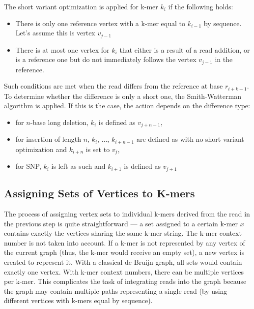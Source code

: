 The short variant optimization is applied for k-mer $k_i$ if the following holds:
\begin{itemize}
\item There is only one reference vertex with a k-mer equal to $k_{i-1}$ by sequence. Let's assume this is vertex $v_{j-1}$
\item There is at most one vertex for $k_i$ that either is a result of a read addition, or is a reference one but do not immediately follows  the vertex $v_{j-1}$ in the reference.
\end{itemize}
Such conditions are met when the read differs from the reference at base $r_{i+k-1}$. To determine whether the difference is only a short one, the Smith-Watterman algorithm is applied. If this is the case, the action depends on the difference type:
\begin{itemize}
\item for $n$-base long deletion, $k_i$ is defined as $v_{j + n - 1}$,
\item for insertion of length $n$, $k_i$, ..., $k_{i + n - 1}$ are defined as with no short variant optimization and $k_{i + n}$ is set to $v_j$,
\item for SNP, $k_i$ is left as such and $k_{i+1}$ is defined as $v_{j+1}$
\end{itemize}

\subsection{Assigning Sets of Vertices to K-mers}
\label{subsec:assign-sets}

The process of assigning vertex sets to individual k-mers derived from the read in the previous step is quite straightforward --- a set assigned to a certain k-mer $x$ contains exactly the vertices sharing the same k-mer string. The k-mer context number is not taken into account. If a k-mer is not represented by any vertex of the current graph (thus, the k-mer would receive an empty set), a new vertex is created to represent it. With a classical de Bruijn graph, all sets would contain exactly one vertex. With k-mer context numbers, there can be multiple vertices per k-mer. This complicates the task of integrating reads into the graph because the graph may contain multiple paths representing a single read (by using different vertices with k-mers equal by sequence).

